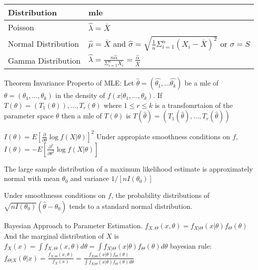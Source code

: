 \documentclass{article}
\begin{document}
\begin{multicols*}{3}
    \begin{tabularx}{0.9\columnwidth} {
            | >{\raggedright\arraybackslash}X
            | >{\raggedleft\arraybackslash}X |}
        \hline
        Distribution        & mle                                                                                                                          \\
        \hline
        Poisson             & $\hat{\lambda} = \bar{X}$                                                                                                    \\
        \hline
        Normal Distribution & $\hat{\mu} = \bar{X}$ and $\hat{\sigma} = \sqrt{\frac{1}{n} \Sigma_{i=1}^n \left( X_i - \bar{X} \right)^2}$  or $\sigma = S$ \\
        \hline
        Gamma Distribution  & $\hat{\lambda} = \frac{n \hat{\alpha}}{\Sigma_{i=1}^n X_i} = \frac{\hat{\alpha}}{\bar{X}}$                                   \\
        \hline
    \end{tabularx}

    Theorem Invariance Properto of MLE:
    Let $\hat{\theta} = \left( \hat{\theta_1}, \dots \hat{\theta_k} \right)$ be a mle of $\theta = \left( \theta_1, \dots, \theta_k \right)$
    in the density of $f\left( x | \theta_1, \dots, \theta_k \right)$.
    If $T\left( \theta \right) = \left( T_1\left( \theta \right) \right), \dots, T_r \left( \theta \right)$ where $1 \leq r \leq k$ is a transfomrtaion
    of the parameter space $\theta$ then a mle of $T \left( \theta  \right)$ is $T\left(\hat{\theta}\right) = \left( T_1\left( \hat{\theta} \right), \dots, T_r\left( \hat{\theta} \right) \right)$

    $I\left(\theta\right) = E \left[ \frac{\partial}{\partial \theta} \log f\left( X|\theta \right)\right]^2$
    Under appropiate smoothness conditions on $f$, $I\left( \theta \right) = -E \left[ \frac{\partial^2}{\partial\theta^2} \log f \left( X |\theta \right)\right]$

    The large sample distribution of a maximum likelihood estimate is approximately normal with mean $\theta_0$ and variance $1/\left[ nI\left( \theta_0 \right) \right]$

    Under smoothnesss conditions on $f$, the probability distributions of $\sqrt{n I \left( \theta_0 \right)} \left( \hat{\theta} - \theta_0 \right)$
    tends to a standard normal distribution.

    Bayesian Approach to Parameter Estimation.
    $f_{X,\Theta} \left( x, \theta \right) = f_{X|\Theta}\left( x|\theta \right)f_\Theta\left( \theta \right)$
    And the marginal distribution of $X$ is $f_X\left( x \right) = \int f_{X,\Theta}\left( x, \theta \right) d\theta = \int f_{X|\Theta} \left( x|\theta \right) f_\Theta \left( \theta \right)d \theta$
    bayesian rule: $f_{\Theta | X}\left( \theta | x \right) = \frac{f_{X,\Theta} \left(x, \theta\right)}{f_X\left( x \right)} = \frac{f_{X|\Theta} \left( x|\theta \right) f_\Theta \left( \theta \right)}{\int f_{X|\Theta} \left( x|\theta \right) f_\Theta \left( \theta \right)d \theta}$


\end{multicols*}
\end{document}
